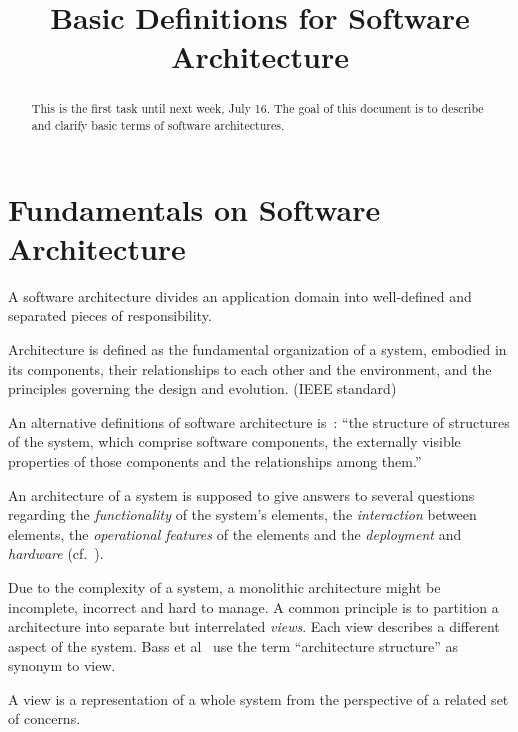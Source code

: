 \documentclass{llncs} %
\begin{document}
\title{Basic Definitions for Software Architecture}
 

\maketitle

\begin{abstract}
This is the first task until next week, July 16.
The goal of this document is to describe and clarify basic terms of software architectures.

\end{abstract}

\section{Fundamentals on Software Architecture}


A software architecture divides an application domain into well-defined and separated pieces of
responsibility.

\begin{definition}[Architecture]
Architecture is defined as the fundamental organization of a system,
embodied in its components, their relationships to each other and
the environment, and the principles governing the design and
evolution. (IEEE standard)
\end{definition}

An alternative definitions of software architecture is~\cite{Buschmann1998POS}:
``the structure of structures of the system, which comprise
software components, the externally visible properties of those components and the relationships
among them.''

An architecture of a system is supposed to give answers to several questions
regarding the \emph{functionality} of the system's elements,
the \emph{interaction} between elements,
the \emph{operational features} of the elements and
the \emph{deployment} and \emph{hardware} (cf.~\cite{Rozanski2005SSA}).

Due to the complexity of a system, a monolithic architecture might
be incomplete, incorrect and hard to manage.
A common principle is to partition a architecture into separate
but interrelated \emph{views}.
Each view describes a different aspect of the system.  
Bass et al~\cite{Bass1998SAI} use the term ``architecture structure'' as synonym to view.

\begin{definition}[View]
A view is a representation of a whole system from the perspective of a related set of concerns.
\end{definition}
\end{document}
